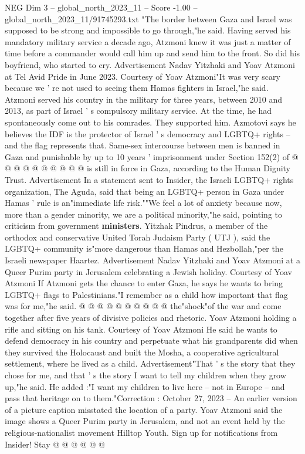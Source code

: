 \begin{textsample}{NEG Dim 3 – global\_north\_2023\_11 – Score -1.00 – global\_north\_2023\_11/91745293.txt}  \label{ex:f3_neg_285}
"The border between Gaza and Israel was supposed to be strong and impossible to go through,"he said.
Having served his mandatory military service a decade ago, Atzmoni knew it was just a matter of time before a commander would call him up and send him to the front.
So did his boyfriend, who started to cry.
Advertisement Nadav Yitzhaki and Yoav Atzmoni at Tel Avid Pride in June 2023.
Courtesy of Yoav Atzmoni"It was very scary because we ' re not used to seeing them Hamas fighters in Israel,"he said.
Atzmoni served his country in the military for three years, between 2010 and 2013, as part of Israel ' s compulsory military service.
At the time, he had spontaneously come out to his comrades.
They supported him.
Azmotovi says he believes the IDF is the protector of Israel ' s democracy and LGBTQ+ rights -- and the flag represents that.
Same-sex intercourse between men is banned in Gaza and punishable by up to 10 years ' imprisonment under Section 152(2) of @ @ @ @ @ @ @ @ @ @ is still in force in Gaza, according to the Human Dignity Trust.
Advertisement In a statement sent to Insider, the Israeli LGBTQ+ rights organization, The Aguda, said that being an LGBTQ+ person in Gaza under Hamas ' rule is an"immediate life risk.""We feel a lot of anxiety because now, more than a gender minority, we are a political minority,"he said, pointing to criticism from government \textbf{ministers}.
Yitzhak Pindrus, a member of the orthodox and conservative United Torah Judaism Party ( UTJ ), said the LGBTQ+ community is"more dangerous than Hamas and Hezbollah,"per the Israeli newspaper Haartez.
Advertisement Nadav Yitzhaki and Yoav Atzmoni at a Queer Purim party in Jerusalem celebrating a Jewish holiday.
Courtesy of Yoav Atzmoni If Atzmoni gets the chance to enter Gaza, he says he wants to bring LGBTQ+ flags to Palestinians."I remember as a child how important that flag was for me,"he said. @ @ @ @ @ @ @ @ @ @ the"shock"of the war and come together after five years of divisive policies and rhetoric.
Yoav Atzmoni holding a rifle and sitting on his tank.
Courtesy of Yoav Atzmoni He said he wants to defend democracy in his country and perpetuate what his grandparents did when they survived the Holocaust and built the Mosha, a cooperative agricultural settlement, where he lived as a child.
Advertisement"That ' s the story that they chose for me, and that ' s the story I want to tell my children when they grow up,"he said.
He added :"I want my children to live here -- not in Europe -- and pass that heritage on to them."Correction : October 27, 2023 -- An earlier version of a picture caption misstated the location of a party.
Yoav Atzmoni said the image shows a Queer Purim party in Jerusalem, and not an event held by the religious-nationalist movement Hilltop Youth.
Sign up for notifications from Insider!
Stay @ @ @ @ @ @

\end{textsample}
